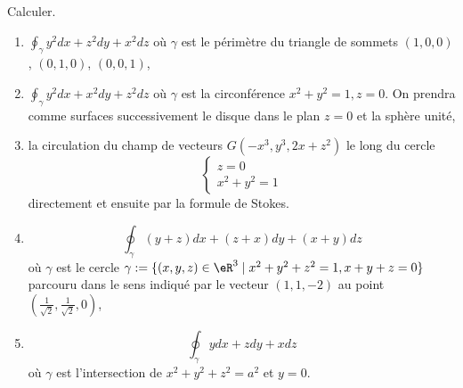 
\begin{exercice}\label{exoVariete0017}

Calculer.
\begin{enumerate}
	\item 
		$\oint_\gamma y^2 dx + z^2 dy +x^2 dz$ où $\gamma$ est le périmètre du triangle de sommets $(1,0,0)$, $(0,1,0)$, $(0,0,1)$,

	\item
		$\oint_\gamma y^2 dx + x^2 dy +z^2 dz$ où $\gamma$ est la circonférence $x^2+y^2=1, z=0$. On prendra comme surfaces successivement le disque dans le  plan $z=0$ et la sphère unité,


	\item
        la circulation du champ de vecteurs $G(-x^3, y^3, 2x+z^2)$ le long du cercle $$\left\{\begin{array}{c} z=0\\ x^2+y^2=1\end{array} \right. $$ directement et ensuite par la formule de Stokes. 
	\item 
		\[ \oint_{\gamma} (y+z)dx + (z+x)dy + (x+y) dz \]
		où $\gamma$ est le cercle $\gamma := \{ (x,y,z) \in \eR^3 \mid x^2+ y^2 + z^2 =1, x+y+z=0 \}$ parcouru dans le sens indiqué par le vecteur $(1,1,- 2)$ au point $(\frac{1}{\sqrt{2}},\frac{1}{\sqrt{2}},0)$,

	\item
		\begin{equation}			
			\oint_\gamma ydx+zdy+xdz
		\end{equation}
		où $\gamma$ est l'intersection de $x^2+y^2+z^2=a^2$ et $y=0$.
\end{enumerate}

\end{exercice}
